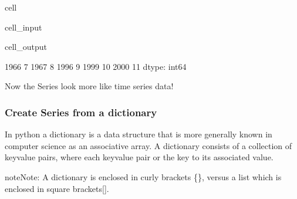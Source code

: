 \documentclass[letterpaper,10pt,english]{jupyterBook}
\begin{document}
\begin{sphinxuseclass}{cell}\begin{sphinxVerbatimInput}

\begin{sphinxuseclass}{cell_input}
\begin{sphinxVerbatim}[commandchars=\\\{\}]
\PYG{p}{[}\PYG{p}{]}
\end{sphinxVerbatim}

\end{sphinxuseclass}\end{sphinxVerbatimInput}
\begin{sphinxVerbatimOutput}

\begin{sphinxuseclass}{cell_output}
\begin{sphinxVerbatim}[commandchars=\\\{\}]
1966     7
1967     8
1996     9
1999    10
2000    11
dtype: int64
\end{sphinxVerbatim}

\end{sphinxuseclass}\end{sphinxVerbatimOutput}

\end{sphinxuseclass}
\sphinxAtStartPar
Now the Series look more like time series data!


\subsubsection{Create Series from a dictionary}
\label{\detokenize{content/04_PythonEssentials/PythonPandasDataframes:create-series-from-a-dictionary}}
\sphinxAtStartPar
In python a dictionary is a data structure that is more generally known in computer science as an associative array. A dictionary consists of a collection of key\sphinxhyphen{}value pairs, where each key\sphinxhyphen{}value pair  or  the key to its associated value.

\begin{sphinxadmonition}{note}{Note:}
\sphinxAtStartPar
A dictionary is enclosed in curly brackets \{\}, versus a list which is enclosed in square brackets{[}{]}.
\end{sphinxadmonition}
\end{document}
